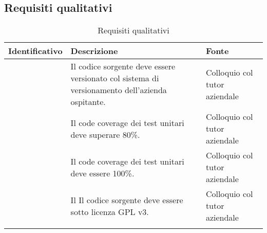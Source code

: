 \subsection{Requisiti qualitativi}\label{subsec:requisiti-qualitativi}
\renewcommand{\arraystretch}{1.5}
\begin{center}
    \begin{longtable}{ | c| C{7cm} |C{3cm} |}
        \hline
        \textbf{Identificativo} & \textbf{Descrizione} &\textbf{Fonte}\\\hline
        &Il codice sorgente deve essere versionato col sistema di versionamento dell'azienda ospitante. &Colloquio col tutor aziendale \\\hline
        &Il code coverage dei test unitari deve superare 80\%.& Colloquio col tutor aziendale\\\hline
        &Il code coverage dei test unitari deve essere 100\%.& Colloquio col tutor aziendale\\\hline
        &Il Il codice sorgente deve essere sotto licenza GPL v3.& Colloquio col tutor aziendale\\\hline
        \caption{Requisiti qualitativi}
    \end{longtable}
\end{center}
\setcounter{subCount}{0}
\setcounter{rowcount}{0}
